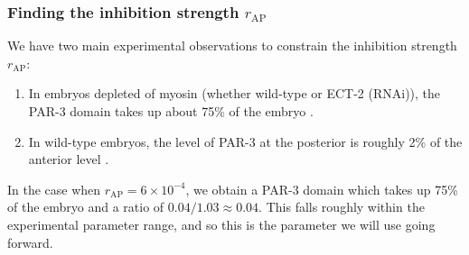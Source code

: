 \documentclass[11pt]{article}
\newcommand{\6}[1]{#1_{\text{6}}}
\newcommand{\3}[1]{#1_{\text{3}}}
\begin{document}
\subsubsection{Finding the inhibition strength $r_\text{AP}$ \label{sec:RAP}}
We have two main experimental observations to constrain the inhibition strength $r_\text{AP}$:
\begin{enumerate}
\item In embryos depleted of myosin (whether wild-type or ECT-2 (RNAi)), the PAR-3 domain takes up about 75\% of the embryo \cite[Fig.~5B]{zonies2010symmetry}.
\item In wild-type embryos, the level of PAR-3 at the posterior is roughly 2\% of the anterior level \cite[Fig.~4C]{sailer2015dynamic}.
\end{enumerate}
In the case when $r_\text{AP}=6 \times 10^{-4}$, we obtain a PAR-3 domain which takes up 75\% of the embryo and a ratio of $0.04/1.03 \approx 0.04$. This falls roughly within the experimental parameter range, and so this is the parameter we will use going forward.
\end{document}
